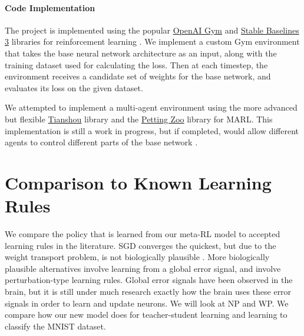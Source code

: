 \documentclass{article}
\begin{document}
\paragraph{Code Implementation} The project is implemented using the popular \href{https://www.gymlibrary.dev/}{OpenAI Gym} and \href{https://stable-baselines3.readthedocs.io/en/master/}{Stable Baselines 3} libraries for reinforcement learning \cite{openaigym, sb3}. We implement a custom Gym environment that takes the base neural network architecture as an input, along with the training dataset used for calculating the loss. Then at each timestep, the environment receives a candidate set of weights for the base network, and evaluates its loss on the given dataset.

We attempted to implement a multi-agent environment using the more advanced but flexible \href{https://github.com/thu-ml/tianshou}{Tianshou} library and the \href{https://pettingzoo.farama.org/}{Petting Zoo} library for MARL. This implementation is still a work in progress, but if completed, would allow different agents to control different parts of the base network \cite{tianshou, pettingzoo}.

\section{Comparison to Known Learning Rules}

We compare the policy that is learned from our meta-RL model to accepted learning rules in the literature. SGD converges the quickest, but due to the weight transport problem, is not biologically plausible \cite{mazzoni1991}. More biologically plausible alternatives involve learning from a global error signal, and involve perturbation-type learning rules. Global error signals have been observed in the brain, but it is still under much research exactly how the brain uses these error signals in order to learn and update neurons. We will look at NP and WP. We compare how our new model does for teacher-student learning and learning to classify the MNIST dataset.
\end{document}
